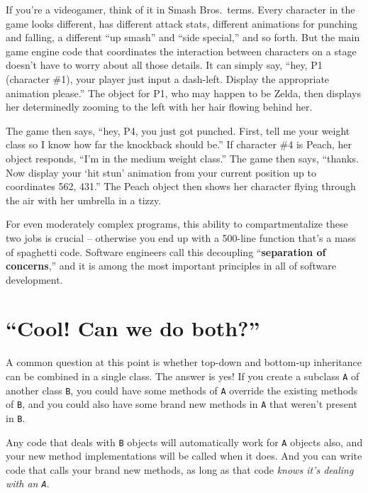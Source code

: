 If you're a videogamer, think of it in Smash Bros.~terms. Every character in
the game looks different, has different attack stats, different animations for
punching and falling, a different ``up smash'' and ``side special,'' and so
forth. But the main game engine code that coordinates the interaction between
characters on a stage doesn't have to worry about all those details. It can
simply say, ``hey, P1 (character \#1), your player just input a dash-left.
Display the appropriate animation please.'' The object for P1, who may happen
to be Zelda, then displays her determinedly zooming to the left with her hair
flowing behind her.

The game then says, ``hey, P4, you just got punched. First, tell me your weight
class so I know how far the knockback should be.'' If character \#4 is Peach,
her object responds, ``I'm in the medium weight class.'' The game then says,
``thanks. Now display your `hit stun' animation from your current position up
to coordinates 562, 431.'' The Peach object then shows her character flying
through the air with her umbrella in a tizzy.

For even moderately complex programs, this ability to compartmentalize these
two jobs is crucial -- otherwise you end up with a 500-line function that's a
mass of spaghetti code. Software engineers call this decoupling
``\textbf{separation of concerns},'' and it is among the most important
principles in all of software development.

\section{``Cool! Can we do both?''}

A common question at this point is whether top-down and bottom-up inheritance
can be combined in a single class. The answer is yes! If you create a
subclass \texttt{A} of another class \texttt{B}, you could have some methods
of \texttt{A} override the existing methods of \texttt{B}, and you could also
have some brand new methods in \texttt{A} that weren't present in \texttt{B}.

Any code that deals with \texttt{B} objects will automatically work for
\texttt{A} objects also, and your new method implementations will be called
when it does. And you can write code that calls your brand new methods, as
long as that code \textit{knows it's dealing with an \texttt{A}}.

